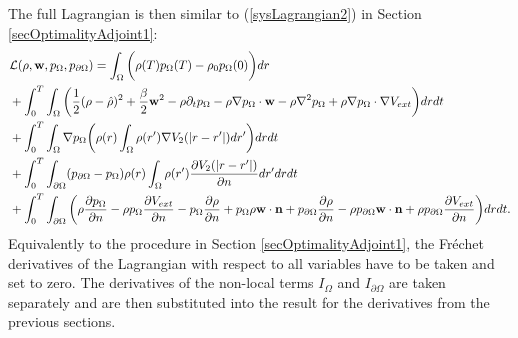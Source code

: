 The full Lagrangian is then similar to (\ref{sysLagrangian2}) in Section \ref{secOptimalityAdjoint1}:
\begin{align}\label{sysLagrangianPlusNonLocal}
&\mathcal{L}(\rho,\mathbf{w}, p_\Omega, p_{\partial \Omega}) =\int_\Omega \bigg(\rho(T) p_\Omega(T)-\rho_0 p_\Omega(0) \bigg) dr\\
&+ \int_0^T \int_\Omega \bigg( \frac{1}{2}(\rho- \hat{\rho})^2  + \frac{\beta}{2} \mathbf{w}^2 - \rho\partial_t  p_\Omega  - \rho \nabla p_\Omega \cdot \mathbf{w}   \notag 
- \rho \nabla^2 p_\Omega +  \rho \nabla p_\Omega\cdot \nabla V_{ext} \bigg)dr dt  \\
&+\int_0^T \int_\Omega \nabla  p_\Omega \bigg( \rho(r) \int_\Omega \rho(r') \nabla V_2(|r-r'|) dr'\bigg)  dr dt \notag \\
&+\int_0^T \int_{\partial \Omega} ( p_{\partial \Omega} - p_\Omega) \rho(r)  \int_\Omega \rho(r') \frac{\partial V_2(|r-r'|)}{\partial n} dr'dr dt \notag \\
& + \int_0^T \int_{\partial \Omega}  \bigg( \rho \frac{\partial p_\Omega }{\partial n}  -  \rho p_\Omega \frac{\partial V_{ext}}{\partial n} 
- p_\Omega \frac{\partial \rho}{\partial n} 
+ p_\Omega \rho \mathbf{w} \cdot \mathbf{n}  \notag 
+ p_{\partial \Omega} \dfrac{\partial \rho}{\partial n} - \rho p_{\partial \Omega} \mathbf{w} \cdot \mathbf{n} + \rho p_{\partial \Omega} \dfrac{\partial V_{ext}}{\partial n}  \bigg) dr dt  \notag.
\end{align}
Equivalently to the procedure in Section \ref{secOptimalityAdjoint1}, the Fr\'echet derivatives of the Lagrangian with respect to all variables have to be taken and set to zero.
The derivatives of the non-local terms $I_\Omega$ and $I_{\partial \Omega}$ are taken separately and are then substituted into the result for the derivatives from the previous sections.


